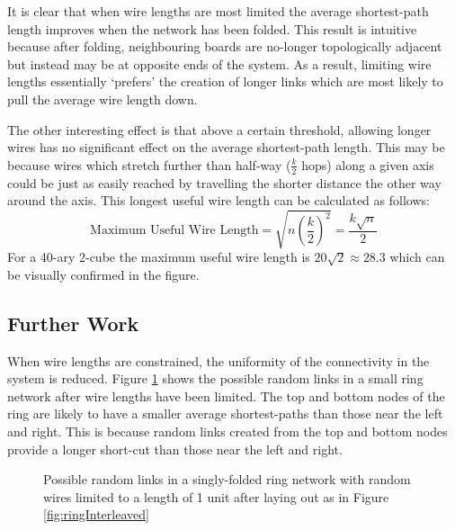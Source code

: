 			It is clear that when wire lengths are most limited the average
			shortest-path length improves when the network has been folded. This
			result is intuitive because after folding, neighbouring boards are
			no-longer topologically adjacent but instead may be at opposite ends of
			the system. As a result, limiting wire lengths essentially `prefers' the
			creation of longer links which are most likely to pull the average wire
			length down.
			
			The other interesting effect is that above a certain threshold, allowing
			longer wires has no significant effect on the average shortest-path
			length. This may be because wires which stretch further than half-way
			($\frac{k}{2}$ hops) along a given axis could be just as easily reached by
			travelling the shorter distance the other way around the axis. This
			longest useful wire length can be calculated as follows:
			\[
				\textrm{Maximum Useful Wire Length}
					= \sqrt{n \left({\frac{k}{2}}\right)^2}
					= \frac{k\sqrt{n}}{2}
			\]
			For a 40-ary 2-cube the maximum useful wire length is $20\sqrt{2} \approx
			28.3$ which can be visually confirmed in the figure.
		
		\subsection{Further Work}
			
			
			When wire lengths are constrained, the uniformity of the connectivity in
			the system is reduced. Figure \ref{fig:ringNetworkLimitedWires} shows the
			possible random links in a small ring network after wire lengths have been
			limited. The top and bottom nodes of the ring are likely to have a smaller
			average shortest-paths than those near the left and right. This is because
			random links created from the top and bottom nodes provide a longer
			short-cut than those near the left and right.
			
			\begin{figure}
				\center
				
				\caption{Possible random links in a singly-folded ring network with
				random wires limited to a length of 1 unit after laying out as in Figure
				\ref{fig:ringInterleaved}}
				\label{fig:ringNetworkLimitedWires}
			\end{figure}
			
